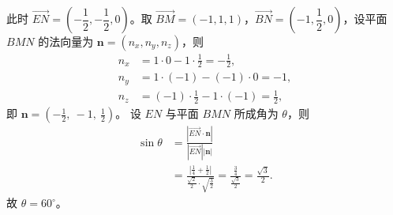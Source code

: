 \begin{answer}
此时 $\overrightarrow{EN}=\left(-\dfrac12,-\dfrac12,0\right)$。取 $\overrightarrow{BM}=(-1,1,1)$，$\overrightarrow{BN}=\left(-1,\dfrac12,0\right)$，设平面 $BMN$ 的法向量为 $\boldsymbol n=(n_x,n_y,n_z)$，则
\nopagebreak[4]
\[\begin{aligned}
n_x&=1\cdot0-1\cdot\tfrac12=-\tfrac12,\\
n_y&=1\cdot(-1)-(-1)\cdot0=-1,\\
n_z&=(-1)\cdot\tfrac12-1\cdot(-1)=\tfrac12,
\end{aligned}\]
即 $\boldsymbol n=\left(-\tfrac12,\ -1,\ \tfrac12\right)$。
设 $EN$ 与平面 $BMN$ 所成角为 $\theta$，则
\nopagebreak[4]
\[\begin{aligned}
\sin\theta&=\frac{\left|\overrightarrow{EN}\cdot\boldsymbol n\right|}{\left|\overrightarrow{EN}\right|\left|\boldsymbol n\right|}\\
&=\frac{\left|\frac14+\frac12\right|}{\frac{\sqrt2}{2}\cdot\sqrt{\frac32}}
=\frac{\frac34}{\frac{\sqrt3}{2}}=\frac{\sqrt3}{2}.
\end{aligned}\]
故 $\theta=60^\circ$。



\end{answer}
